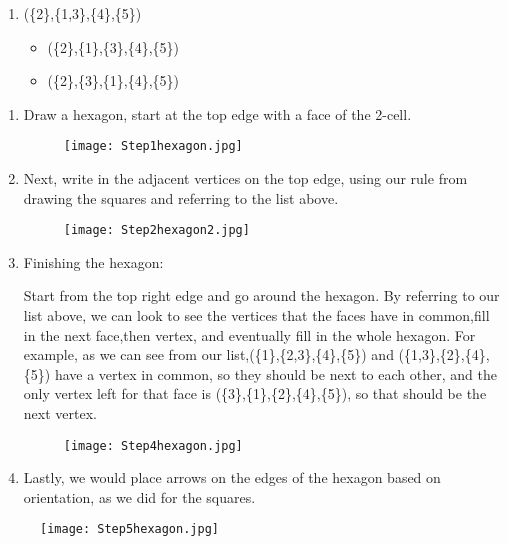 \documentclass{amsart}
\begin{document}
\begin{exmp}
\begin{enumerate}
\item
(\{2\},\{1,3\},\{4\},\{5\})
\begin{itemize}
\item 
(\{2\},\{1\},\{3\},\{4\},\{5\})
\item
(\{2\},\{3\},\{1\},\{4\},\{5\})
\end{itemize}
\end{enumerate}
\begin{enumerate}
\item
Draw a hexagon, start at the top edge with a face of the 2-cell.
\begin{figure}[htb!]
\texttt{[image: Step1hexagon.jpg]}
\centering
\end{figure}
\item
Next, write in the adjacent vertices on the top edge, using our rule from drawing the squares and referring to the list above. 
\begin{figure}[htb!]
\texttt{[image: Step2hexagon2.jpg]}
\centering
\end{figure}
\item
Finishing the hexagon:

Start from the top right edge and go around the hexagon. By referring to our list above, we can look to see the vertices that the faces have in common,fill in the next face,then vertex, and eventually fill in the whole hexagon.
For example, as we can see from our list,(\{1\},\{2,3\},\{4\},\{5\}) and (\{1,3\},\{2\},\{4\},\{5\}) have a vertex in common, so they should be next to each other, and the only vertex left for that face is (\{3\},\{1\},\{2\},\{4\},\{5\}), so that should be the next vertex.
\begin{figure}[htb!]
\texttt{[image: Step4hexagon.jpg]}
\centering
\end{figure}
\item
Lastly, we would place arrows on the edges of the hexagon based on orientation, as we did for the squares.
\end{enumerate}
\begin{figure}[htb!] 
\texttt{[image: Step5hexagon.jpg]}
\centering
\end{figure}
\end{exmp}
\end{document}
